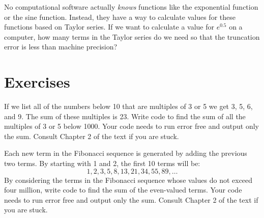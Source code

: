 \begin{problem}
    No computational software actually {\it knows} functions like the exponential function
    or the sine function.  Instead, they have a way to calculate values for these
    functions based on Taylor series.  
    If we want to calculate a value for $e^{0.5}$ on a computer, how many terms in the
    Taylor series do we need so that the truncation error is less than machine precision?
\end{problem}



\section{Exercises}

\begin{problem}
    If we list all of the numbers below 10 that are multiples of 3 or 5 we get 3, 5, 6,
    and 9.  The sum of these multiples is 23.  Write code to find the sum of all the
    multiples of 3 or 5 below 1000.  Your code needs to run error free and output only the
    sum.  Consult Chapter 2 of the text if you are stuck.
\end{problem}


\begin{homework}
    Each new term in the Fibonacci sequence is generated by adding the previous two terms.
    By starting with 1 and 2, the first 10 terms will be:
    \[ 1, 2, 3, 5, 8, 13, 21, 34, 55, 89, \dots \]
    By considering the terms in the Fibonacci sequence whose values do not exceed four
    million, write code to find the sum of the even-valued terms. Your code needs to run
    error free and output only the sum.  Consult Chapter 2 of the text if you are stuck.
\end{homework}

